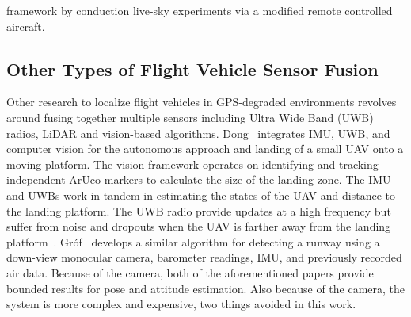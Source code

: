 framework by conduction live-sky experiments via a modified remote controlled aircraft.

\subsection{\textbf{Other Types of Flight Vehicle Sensor Fusion}}
Other research to localize flight vehicles in GPS-degraded environments revolves around fusing together multiple sensors including Ultra Wide Band (UWB) radios, LiDAR and vision-based algorithms. Dong~\cite{dongIntegratedUWBIMUVisionFramework2022} integrates IMU, UWB, and computer vision for the autonomous approach and landing of a small UAV onto a moving platform. The vision framework operates on identifying and tracking independent ArUco markers to calculate the size of the landing zone. The IMU and UWBs work in tandem in estimating the states of the UAV and distance to the landing platform. The UWB radio provide updates at a high frequency but suffer from noise and dropouts when the UAV is farther away from the landing platform~\cite{dongIntegratedUWBIMUVisionFramework2022}. Gr\'of~\cite{grofPositioningAircraftRelative2022} develops a similar algorithm for detecting a runway using a down-view monocular camera, barometer readings, IMU, and previously recorded air data. Because of the camera, both of the aforementioned papers provide bounded results for pose and attitude estimation. Also because of the camera, the system is more complex and expensive, two things avoided in this work.

